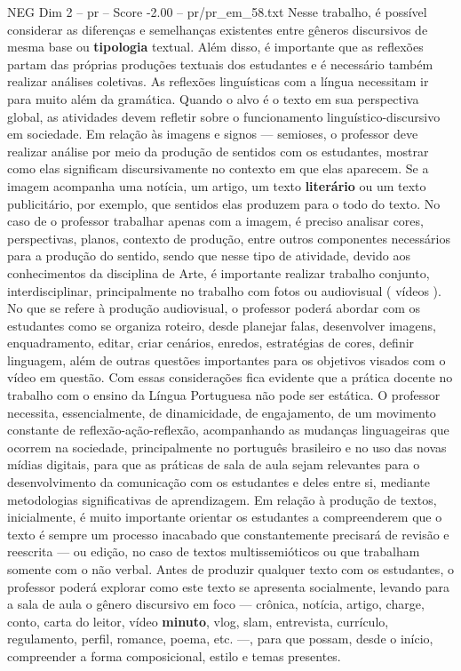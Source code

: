 \begin{textsample}{NEG Dim 2 – pr – Score -2.00 – pr/pr\_em\_58.txt}
Nesse trabalho, é possível considerar as diferenças e semelhanças existentes entre gêneros discursivos de mesma base ou \textbf{tipologia} textual.
Além disso, é importante que as reflexões partam das próprias produções textuais dos estudantes e é necessário também realizar análises coletivas.
As reflexões linguísticas com a língua necessitam ir para muito além da gramática.
Quando o alvo é o texto em sua perspectiva global, as atividades devem refletir sobre o funcionamento linguístico-discursivo em sociedade.
Em relação às imagens e signos — semioses, o professor deve realizar análise por meio da produção de sentidos com os estudantes, mostrar como elas significam discursivamente no contexto em que elas aparecem.
Se a imagem acompanha uma notícia, um artigo, um texto \textbf{literário} ou um texto publicitário, por exemplo, que sentidos elas produzem para o todo do texto.
No caso de o professor trabalhar apenas com a imagem, é preciso analisar cores, perspectivas, planos, contexto de produção, entre outros componentes necessários para a produção do sentido, sendo que nesse tipo de atividade, devido aos conhecimentos da disciplina de Arte, é importante realizar trabalho conjunto, interdisciplinar, principalmente no trabalho com fotos ou audiovisual ( vídeos ).
No que se refere à produção audiovisual, o professor poderá abordar com os estudantes como se organiza roteiro, desde planejar falas, desenvolver imagens, enquadramento, editar, criar cenários, enredos, estratégias de cores, definir linguagem, além de outras questões importantes para os objetivos visados com o vídeo em questão.
Com essas considerações fica evidente que a prática docente no trabalho com o ensino da Língua Portuguesa não pode ser estática.
O professor necessita, essencialmente, de dinamicidade, de engajamento, de um movimento constante de reflexão-ação-reflexão, acompanhando as mudanças linguageiras que ocorrem na sociedade, principalmente no português brasileiro e no uso das novas mídias digitais, para que as práticas de sala de aula sejam relevantes para o desenvolvimento da comunicação com os estudantes e deles entre si, mediante metodologias significativas de aprendizagem.
Em relação à produção de textos, inicialmente, é muito importante orientar os estudantes a compreenderem que o texto é sempre um processo inacabado que constantemente precisará de revisão e reescrita — ou edição, no caso de textos multissemióticos ou que trabalham somente com o não verbal.
Antes de produzir qualquer texto com os estudantes, o professor poderá explorar como este texto se apresenta socialmente, levando para a sala de aula o gênero discursivo em foco — crônica, notícia, artigo, charge, conto, carta do leitor, vídeo \textbf{minuto}, vlog, slam, entrevista, currículo, regulamento, perfil, romance, poema, etc. —, para que possam, desde o início, compreender a forma composicional, estilo e temas presentes.

\end{textsample}
